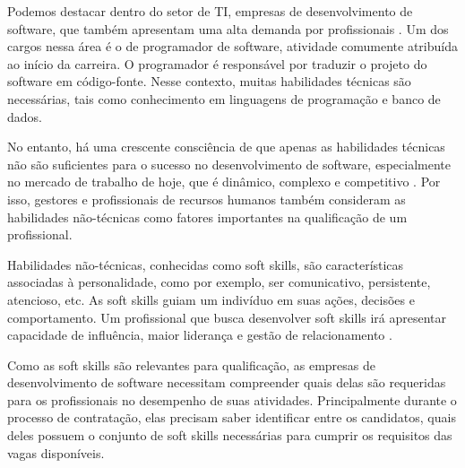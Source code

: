
Podemos destacar dentro do setor de TI, empresas de desenvolvimento de software, que também apresentam uma alta demanda por profissionais \cite{kennan:09}. Um dos cargos nessa área é o de programador de software, atividade comumente atribuída ao início da carreira. O programador é responsável por traduzir o projeto do software em código-fonte. Nesse contexto, muitas habilidades técnicas são necessárias, tais como conhecimento em linguagens de programação e banco de dados.

No entanto, há uma crescente consciência de que apenas as habilidades técnicas não são suficientes para o sucesso no desenvolvimento de software, especialmente no mercado de trabalho de hoje, que é dinâmico, complexo e competitivo \cite{joseph:10}. Por isso, gestores e profissionais de recursos humanos também consideram as habilidades não-técnicas como fatores importantes na qualificação de um profissional.

Habilidades não-técnicas, conhecidas como soft skills, são características associadas à personalidade, como por exemplo, ser comunicativo, persistente, atencioso, etc. As soft skills guiam um indivíduo em suas ações, decisões e comportamento. Um profissional que busca desenvolver soft skills irá apresentar capacidade de influência, maior liderança e gestão de relacionamento \cite{hjyunus:12}.

Como as soft skills são relevantes para qualificação, as empresas de desenvolvimento de software necessitam compreender quais delas são requeridas para os profissionais no desempenho de suas atividades. Principalmente durante o processo de contratação, elas precisam saber identificar entre os candidatos, quais deles possuem o conjunto de soft skills necessárias para cumprir os requisitos das vagas disponíveis.

